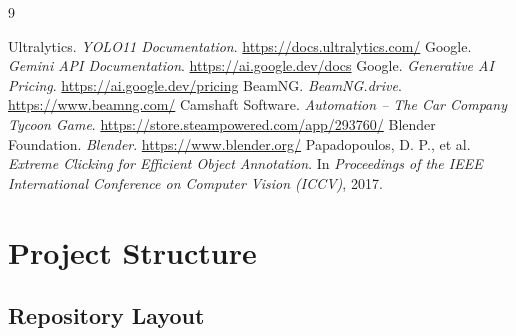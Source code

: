 \documentclass[12pt,a4paper]{article}
\begin{document}

\begin{thebibliography}{9}

	 Ultralytics. \textit{YOLO11 Documentation}. \url{https://docs.ultralytics.com/}
	 Google. \textit{Gemini API Documentation}. \url{https://ai.google.dev/docs}
	 Google. \textit{Generative AI Pricing}. \url{https://ai.google.dev/pricing}
	 BeamNG. \textit{BeamNG.drive}. \url{https://www.beamng.com/}
	 Camshaft Software. \textit{Automation -- The Car Company Tycoon Game}. \url{https://store.steampowered.com/app/293760/}
	 Blender Foundation. \textit{Blender}. \url{https://www.blender.org/}
	 Papadopoulos, D. P., et al. \textit{Extreme Clicking for Efficient Object Annotation}. In \textit{Proceedings of the IEEE International Conference on Computer Vision (ICCV)}, 2017.

\end{thebibliography}

\appendix

\section{Project Structure}

\subsection*{Repository Layout}
\end{document}

